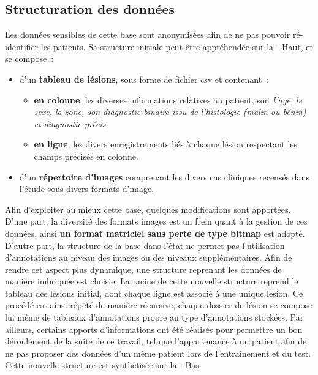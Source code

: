 \subsection{Structuration des données}
\label{sec:dataset_organisation}
Les données sensibles de cette base sont anonymisées afin de ne pas pouvoir ré-identifier les patients. Sa structure initiale peut être appréhendée sur la  - Haut, et se compose~:
\begin{itemize}
    \item d'un \textbf{tableau de lésions}, sous forme de fichier \gls{csv} et contenant~:
    \begin{itemize}
        \item \textbf{en colonne}, les diverses informations relatives au patient, soit \textit{l'âge, le sexe, la zone, son diagnostic binaire issu de l'histologie (malin ou bénin) et diagnostic précis},
        \item \textbf{en ligne}, les divers enregistrements liés à chaque lésion respectant les champs précisés en colonne.
    \end{itemize}
    \item d'un \textbf{répertoire d'images} comprenant les divers cas cliniques recensés dans l'étude sous divers formats d'image.
\end{itemize}\par

Afin d'exploiter au mieux cette base, quelques modifications sont apportées. D'une part, la diversité des formats images est un frein quant à la gestion de ces données, ainsi \textbf{un format matriciel sans perte de type bitmap} est adopté. D'autre part, la structure de la base dans l'état ne permet pas l'utilisation d'annotations au niveau des images ou des niveaux supplémentaires. Afin de rendre cet aspect plus dynamique, une structure reprenant les données de manière imbriquée est choisie. La racine de cette nouvelle structure reprend le tableau des lésions initial, dont chaque ligne est associé à une unique lésion. Ce procédé est ainsi répété de manière récursive, chaque dossier de lésion se compose lui même de tableaux d'annotations propre au type d'annotations stockées. Par ailleurs, certains apports d'informations ont été réalisés pour permettre un bon déroulement de la suite de ce travail, tel que l'appartenance à un patient afin de ne pas proposer des données d'un même patient lors de l'entraînement et du test. Cette nouvelle structure est synthétisée sur la  - Bas.\par

